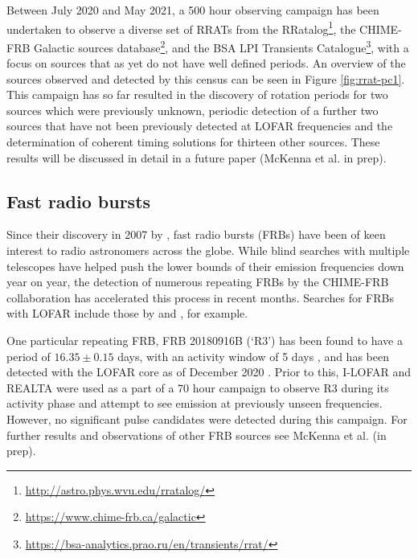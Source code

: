 Between July 2020 and May 2021, a 500 hour observing campaign has been undertaken to observe a diverse set of RRATs from the RRatalog\footnote{\hyperref[RRatalog]{http://astro.phys.wvu.edu/rratalog/}}, the CHIME-FRB Galactic sources database\footnote{\hyperref[CHIME-FRB Galactic Sources]{https://www.chime-frb.ca/galactic}}, and the BSA LPI Transients Catalogue\footnote{\hyperref[BSA LPI Transients Catalogue]{https://bsa-analytics.prao.ru/en/transients/rrat/}}, with a focus on sources that as yet do not have well defined periods. An overview of the sources observed and detected by this census can be seen in Figure \ref{fig:rrat-pc1}. This campaign has so far resulted in the discovery of rotation periods for two sources which were previously unknown, periodic detection of a further two sources that have not been previously detected at LOFAR frequencies and the determination of coherent timing solutions for thirteen other sources. These results will be discussed in detail in a future paper (McKenna et al. in prep).%


\subsection{Fast radio bursts}
Since their discovery in 2007 by \citeauthor{Lorimer2007}, fast radio bursts (FRBs) have been of keen interest to radio astronomers across the globe. While blind searches with multiple telescopes have helped push the lower bounds of their emission frequencies down year on year, the detection of numerous repeating FRBs by the CHIME-FRB collaboration \citep{CHIME2019} has accelerated this process in recent months. Searches for FRBs with LOFAR include those by \cite{Karastergiou2015} and \cite{TerVeen2019}, for example.

One particular repeating FRB, FRB 20180916B (`R3') has been found to have a period of $16.35\pm 0.15$ days, with an activity window of 5 days \citep{Amiri2020}, and has been detected with the LOFAR core as of December 2020 \citep{Pastor-Marazuela2020, Pleunis2021}. Prior to this, I-LOFAR and REALTA were used as a part of a 70 hour campaign to observe R3 during its activity phase and attempt to see emission at previously unseen frequencies. However, no significant pulse candidates were detected during this campaign. For further results and observations of other FRB sources see McKenna et al. (in prep).

